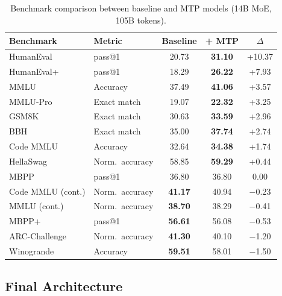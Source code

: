 \documentclass{llmxive}
\providecommand{\tableheadercolor}{}
\begin{document}
\begin{table}[!tb]
  \centering
  \small
  \begin{tabular}{@{}llccc@{}}
    \toprule
    \tableheadercolor
    \textbf{Benchmark} & \textbf{Metric} & \textbf{Baseline} & \textbf{+ MTP} & \textbf{$\Delta$} \\
    \midrule
    HumanEval         & pass@1           & 20.73          & \textbf{31.10} & +10.37 \\
    HumanEval+        & pass@1           & 18.29          & \textbf{26.22} & +7.93  \\
    MMLU              & Accuracy         & 37.49          & \textbf{41.06} & +3.57  \\
    MMLU-Pro          & Exact match      & 19.07          & \textbf{22.32} & +3.25  \\
    GSM8K             & Exact match      & 30.63          & \textbf{33.59} & +2.96  \\
    BBH               & Exact match      & 35.00          & \textbf{37.74} & +2.74  \\
    Code MMLU         & Accuracy         & 32.64          & \textbf{34.38} & +1.74  \\
    HellaSwag         & Norm.\ accuracy  & 58.85          & \textbf{59.29} & +0.44  \\
    MBPP              & pass@1           & 36.80          & 36.80          &  0.00  \\
    Code MMLU (cont.) & Norm.\ accuracy  & \textbf{41.17} & 40.94          & $-$0.23 \\
    MMLU (cont.)      & Norm.\ accuracy  & \textbf{38.70} & 38.29          & $-$0.41 \\
    MBPP+             & pass@1           & \textbf{56.61} & 56.08          & $-$0.53 \\
    ARC-Challenge     & Norm.\ accuracy  & \textbf{41.30} & 40.10          & $-$1.20 \\
    Winogrande        & Accuracy         & \textbf{59.51} & 58.01          & $-$1.50 \\
    \bottomrule
  \end{tabular}
\caption{Benchmark comparison between baseline and MTP models (14B MoE,
    105B tokens).}
\label{tab:mtp-benchmarks}
\end{table}


\subsection{Final Architecture}
\label{sec:final-arch}
\end{document}
